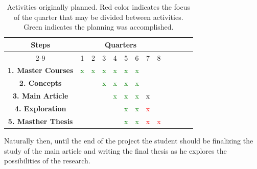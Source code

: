 \documentclass[12pt]{report}
\begin{document}
\begin{table}[ht]
	\centering
	\begin{tabular}{|c|c|c|c|c|c|c|c|c|c|c|c|c|}
		\hline
		\multirow{2}{*}{{\bf Steps}} & \multicolumn{8}{c|}{{\bf Quarters}}
		\\ \cline{2-9}
		& 1 & 2 & 3 & 4 & 5 & 6 & 7 & 8
		\\ \hline
		{\bf 1. Master Courses} & \textcolor{green}{x} & \textcolor{green}{x} & \textcolor{green}{x} & \textcolor{green}{x} & \textcolor{green}{x}  & \textcolor{green}{x}  & & 
		\\ \hline
		{\bf 2. Concepts} &  &  & \textcolor{green}{x}  & \textcolor{green}{x}  & \textcolor{green}{x} & \textcolor{green}{x}  & &
		\\ \hline
		{\bf 3. Main Article} & & & & \textcolor{green}{x}  & \textcolor{green}{x}  & \textcolor{green}{x} & x &
		\\ \hline
		{\bf 4. Exploration} & & & & & \textcolor{green}{x} & \textcolor{green}{x} & \textcolor{red}{x} & 
		\\ \hline
		{\bf 5. Masther Thesis} & & & & & \textcolor{green}{x}  & \textcolor{green}{x} & \textcolor{red}{x} & \textcolor{red}{x}
		\\ \hline
	\end{tabular}
	\caption{Activities originally planned. Red color indicates the focus of the quarter that may be divided between activities. Green indicates the planning was accomplished.}
	\label{tab:cronograma1ano}
\end{table}

Naturally then, until the end of the project the student should be finalizing the study of the main article and writing the final thesis as he explores the possibilities of the research.
\end{document}
